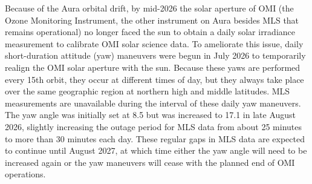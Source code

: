 Because of the Aura orbital drift, by mid-2026 the solar aperture of OMI (the Ozone Monitoring Instrument, the other instrument on Aura besides MLS that remains operational) no longer faced the sun to obtain a daily solar irradiance measurement to calibrate OMI solar science data. To ameliorate this issue, daily short-duration attitude (yaw) maneuvers were begun in July 2026 to temporarily realign the OMI solar aperture with the sun. Because these yaws are performed every 15th orbit, they occur at different times of day, but they always take place over the same geographic region at northern high and middle latitudes. MLS measurements are unavailable during the interval of these daily yaw maneuvers. The yaw angle was initially set at 8.5{\degsym} but was increased to 17.1{\degsym} in late August 2026, slightly increasing the outage period for MLS data from about 25 minutes to more than 30 minutes each day. These regular gaps in MLS data are expected to continue until August 2027, at which time either the yaw angle will need to be increased again or the yaw maneuvers will cease with the planned end of OMI operations.
